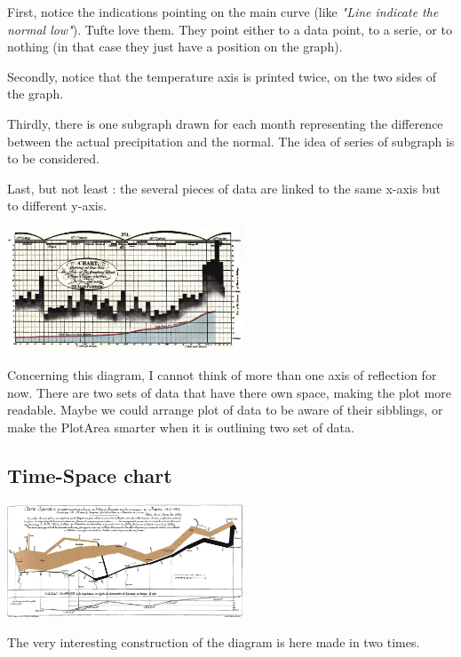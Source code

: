 First, notice the indications pointing on the main curve (like \emph{"Line indicate the normal low"}). Tufte love them.
 They point either to a data point, to a serie, or to nothing (in that case they just have a position on the graph).

Secondly, notice that the temperature axis is printed twice, on the two sides of the graph.

Thirdly, there is one subgraph drawn for each month representing the difference between the actual precipitation and the normal.
 The idea of series of subgraph is to be considered.

Last, but not least : the several pieces of data are linked to the same x-axis but to different y-axis.

\centerline{
\includegraphics[width=07cm]{./illustrations/annexes/temps_ble.eps}
}
Concerning this diagram, I cannot think of more than one axis of reflection for now. There are two sets of data that have there own space, making the plot more readable. Maybe we could arrange plot of data to be aware of their sibblings, or make the PlotArea smarter when it is outlining two set of data.


\subsection{Time-Space chart}
\centerline{
\includegraphics[width=07cm]{./illustrations/annexes/tempscarte_napoleon.eps}
}
The very interesting construction of the diagram is here made in two times.

